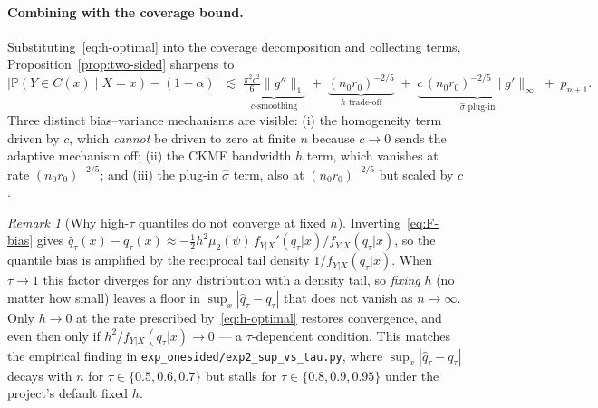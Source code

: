 \documentclass[11pt]{article}
\theoremstyle{remark}
\newtheorem{remark}[theorem]{Remark}
\begin{document}
\paragraph{Combining with the coverage bound.}
Substituting~\eqref{eq:h-optimal} into the coverage decomposition
and collecting terms, Proposition~\ref{prop:two-sided} sharpens to
\begin{equation}\label{eq:two-sided-full}
\bigl|\mathbb{P}(Y\in C(x)\mid X=x) - (1-\alpha)\bigr|
  \;\lesssim\;
  \underbrace{\tfrac{\pi^{2} c^{2}}{6}\|g''\|_{1}}_{\text{$c$-smoothing}}
  \;+\; \underbrace{(n_0 r_0)^{-2/5}}_{\text{$h$ trade-off}}
  \;+\; \underbrace{c\,(n_0 r_0)^{-2/5}\|g'\|_{\infty}}_{\text{$\hat\sigma$ plug-in}}
  \;+\; p_{n+1}.
\end{equation}
Three distinct bias--variance mechanisms are visible:
(i) the homogeneity term driven by $c$, which \emph{cannot} be
driven to zero at finite $n$ because $c\to 0$ sends the adaptive
mechanism off; (ii) the CKME bandwidth $h$ term, which vanishes at
rate $(n_0 r_0)^{-2/5}$; and (iii) the plug-in $\hat\sigma$ term,
also at $(n_0 r_0)^{-2/5}$ but scaled by $c$.

\begin{remark}[Why high-$\tau$ quantiles do not converge at fixed $h$]
\label{rem:tail-nonconvergence}
Inverting~\eqref{eq:F-bias} gives
$\hat q_{\tau}(x) - q_{\tau}(x) \approx
    -\tfrac{1}{2} h^{2}\mu_{2}(\psi)\,
        f_{Y|X}'(q_{\tau}|x) / f_{Y|X}(q_{\tau}|x)$,
so the quantile bias is amplified by the reciprocal tail density
$1/f_{Y|X}(q_{\tau}|x)$. When $\tau\to 1$ this factor diverges for
any distribution with a density tail, so \emph{fixing} $h$ (no
matter how small) leaves a floor in $\sup_{x}|\hat q_{\tau}-q_{\tau}|$
that does not vanish as $n\to\infty$. Only $h\to 0$ at the rate
prescribed by~\eqref{eq:h-optimal} restores convergence, and even
then only if $h^{2}/f_{Y|X}(q_{\tau}|x)\to 0$ ---
a $\tau$-dependent condition. This matches the empirical finding
in \texttt{exp\_onesided/exp2\_sup\_vs\_tau.py}, where
$\sup_{x}|\hat q_{\tau}-q_{\tau}|$ decays with $n$ for
$\tau\in\{0.5,0.6,0.7\}$ but stalls for
$\tau\in\{0.8,0.9,0.95\}$ under the project's default fixed $h$.
\end{remark}
\end{document}
